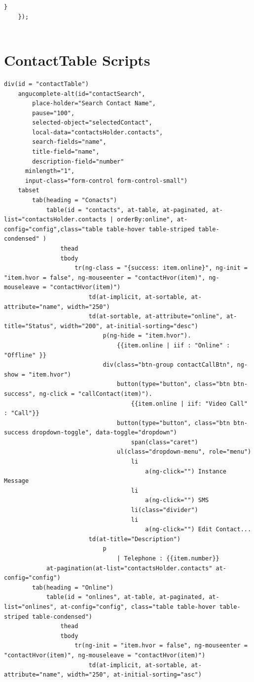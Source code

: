 \begin{appendices}
\begin{lstlisting}[caption={WebRTCService.js in application client},label={code:webrtc_service}]
		}
	});	
	
\end{lstlisting}

\section{ContactTable Scripts} \label{app:contact_table}

\begin{lstlisting}[caption={contactTable.jade in application client},label={code:contact_table}]
div(id = "contactTable")
	angucomplete-alt(id="contactSearch",
		place-holder="Search Contact Name",
		pause="100",
		selected-object="selectedContact",
		local-data="contactsHolder.contacts",
		search-fields="name",
		title-field="name",
		description-field="number"
	  minlength="1",
	  input-class="form-control form-control-small")
	tabset
		tab(heading = "Conacts")
			table(id = "contacts", at-table, at-paginated, at-list="contactsHolder.contacts | orderBy:online", at-config="config",class="table table-hover table-striped table-condensed" )
				thead
				tbody
					tr(ng-class = "{success: item.online}", ng-init = "item.hvor = false", ng-mouseenter = "contactHvor(item)", ng-mouseleave = "contactHvor(item)")
						td(at-implicit, at-sortable, at-attribute="name", width="250")
						td(at-sortable, at-attribute="online", at-title="Status", width="200", at-initial-sorting="desc")
							p(ng-hide = "item.hvor").
								{{item.online | iif : "Online" : "Offline" }}
							div(class="btn-group contactCallBtn", ng-show = "item.hvor")
								button(type="button", class="btn btn-success", ng-click = "callContact(item)").
									{{item.online | iif: "Video Call" : "Call"}}
								button(type="button", class="btn btn-success dropdown-toggle", data-toggle="dropdown")
									span(class="caret")
								ul(class="dropdown-menu", role="menu")
									li
										a(ng-click="") Instance Message
									li
										a(ng-click="") SMS
									li(class="divider")
									li
										a(ng-click="") Edit Contact...
						td(at-title="Description")
							p
								| Telephone : {{item.number}}
			at-pagination(at-list="contactsHolder.contacts" at-config="config")
		tab(heading = "Online")
			table(id = "onlines", at-table, at-paginated, at-list="onlines", at-config="config", class="table table-hover table-striped table-condensed")
				thead
				tbody
					tr(ng-init = "item.hvor = false", ng-mouseenter = "contactHvor(item)", ng-mouseleave = "contactHvor(item)")
						td(at-implicit, at-sortable, at-attribute="name", width="250", at-initial-sorting="asc")

\end{lstlisting}
\end{appendices}

